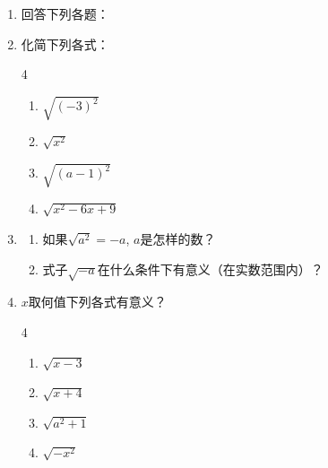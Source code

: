 \begin{ex}
\begin{enumerate}
    \item 回答下列各题：
    \begin{enumerate}
\end{enumerate}



\item 化简下列各式：
\begin{multicols}{4}
    \begin{enumerate}
    \item $\sqrt{(-3)^2}$
    \item $\sqrt{x^2}$
    \item $\sqrt{(a-1)^2}$
    \item $\sqrt{x^2-6x+9}$
\end{enumerate}
\end{multicols}



\item 
\begin{enumerate}
    \item 如果$\sqrt{a^2}=-a$, $a$是怎样的数？
    \item 式子$\sqrt{-a}$在什么条件下有意义（在实数范围内）？
\end{enumerate}


\item $x$取何值下列各式有意义？
\begin{multicols}{4}
  \begin{enumerate}
    \item $\sqrt{x-3}$
    \item $\sqrt{x+4}$
    \item $\sqrt{a^2+1}$
    \item $\sqrt{-x^2}$
\end{enumerate}  
\end{multicols}



\end{enumerate}
\end{ex}
